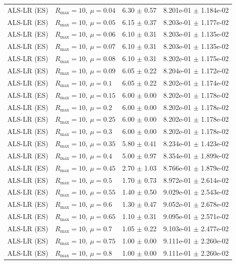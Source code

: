\begin{table}[t]
\begin{tabular}{@{}llcc@{}}
ALS-LR (ES) & \(R_{\max}=10,\ \mu=0.04\) & 6.30 $\pm$ 0.57 & 8.201e-01 $\pm$ 1.184e-02 \\
ALS-LR (ES) & \(R_{\max}=10,\ \mu=0.05\) & 6.15 $\pm$ 0.37 & 8.203e-01 $\pm$ 1.177e-02 \\
ALS-LR (ES) & \(R_{\max}=10,\ \mu=0.06\) & 6.10 $\pm$ 0.31 & 8.203e-01 $\pm$ 1.135e-02 \\
ALS-LR (ES) & \(R_{\max}=10,\ \mu=0.07\) & 6.10 $\pm$ 0.31 & 8.203e-01 $\pm$ 1.135e-02 \\
ALS-LR (ES) & \(R_{\max}=10,\ \mu=0.08\) & 6.10 $\pm$ 0.31 & 8.202e-01 $\pm$ 1.175e-02 \\
ALS-LR (ES) & \(R_{\max}=10,\ \mu=0.09\) & 6.05 $\pm$ 0.22 & 8.204e-01 $\pm$ 1.172e-02 \\
ALS-LR (ES) & \(R_{\max}=10,\ \mu=0.1\) & 6.05 $\pm$ 0.22 & 8.202e-01 $\pm$ 1.174e-02 \\
ALS-LR (ES) & \(R_{\max}=10,\ \mu=0.15\) & 6.00 $\pm$ 0.00 & 8.202e-01 $\pm$ 1.178e-02 \\
ALS-LR (ES) & \(R_{\max}=10,\ \mu=0.2\) & 6.00 $\pm$ 0.00 & 8.202e-01 $\pm$ 1.178e-02 \\
ALS-LR (ES) & \(R_{\max}=10,\ \mu=0.25\) & 6.00 $\pm$ 0.00 & 8.202e-01 $\pm$ 1.178e-02 \\
ALS-LR (ES) & \(R_{\max}=10,\ \mu=0.3\) & 6.00 $\pm$ 0.00 & 8.202e-01 $\pm$ 1.178e-02 \\
ALS-LR (ES) & \(R_{\max}=10,\ \mu=0.35\) & 5.80 $\pm$ 0.41 & 8.234e-01 $\pm$ 1.423e-02 \\
ALS-LR (ES) & \(R_{\max}=10,\ \mu=0.4\) & 5.00 $\pm$ 0.97 & 8.354e-01 $\pm$ 1.899e-02 \\
ALS-LR (ES) & \(R_{\max}=10,\ \mu=0.45\) & 2.70 $\pm$ 1.03 & 8.766e-01 $\pm$ 1.879e-02 \\
ALS-LR (ES) & \(R_{\max}=10,\ \mu=0.5\) & 1.70 $\pm$ 0.73 & 8.972e-01 $\pm$ 2.614e-02 \\
ALS-LR (ES) & \(R_{\max}=10,\ \mu=0.55\) & 1.40 $\pm$ 0.50 & 9.029e-01 $\pm$ 2.543e-02 \\
ALS-LR (ES) & \(R_{\max}=10,\ \mu=0.6\) & 1.30 $\pm$ 0.47 & 9.052e-01 $\pm$ 2.678e-02 \\
ALS-LR (ES) & \(R_{\max}=10,\ \mu=0.65\) & 1.10 $\pm$ 0.31 & 9.095e-01 $\pm$ 2.571e-02 \\
ALS-LR (ES) & \(R_{\max}=10,\ \mu=0.7\) & 1.05 $\pm$ 0.22 & 9.103e-01 $\pm$ 2.477e-02 \\
ALS-LR (ES) & \(R_{\max}=10,\ \mu=0.75\) & 1.00 $\pm$ 0.00 & 9.111e-01 $\pm$ 2.260e-02 \\
ALS-LR (ES) & \(R_{\max}=10,\ \mu=0.8\) & 1.00 $\pm$ 0.00 & 9.111e-01 $\pm$ 2.260e-02 \\

\end{tabular}
\end{table}
